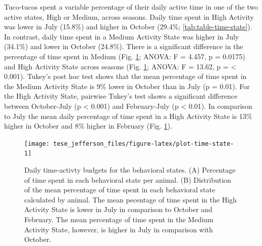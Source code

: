 \documentclass[english,msc,numbers,hidelinks]{coppe}
\begin{document}
  Tuco-tucos spent a variable percentage of their daily active time in one of the two active states, High or Medium, across seasons. Daily time spent in High Activity was lower in July (15.8\%) and higher in October (29.4\%; \ref{tab:table-time-state}). In contrast, daily time spent in a Medium Activity State was higher in July (34.1\%) and lower in October (24.8\%). There is a significant difference in the percentage of time spent in Medium (Fig. \ref{fig:plot-time-state}; ANOVA: F = 4.457, p = 0.0175) and High Activity State across seasons (Fig. \ref{fig:plot-time-state}; ANOVA: F = 13.62, p = \textless{} 0.001). Tukey's post hoc test shows that the mean percentage of time spent in the Medium Activity State is 9\% lower in October than in July (p = 0.01). For the High Activity State, pairwise Tukey's test shows a significant difference between October-July (p \textless{} 0.001) and February-July (p \textless{} 0.01). In comparison to July the mean daily percentage of time spent in a High Activity State is 13\% higher in October and 8\% higher in February (Fig. \ref{fig:plot-time-state}).
  \begin{figure}

  {\centering \texttt{[image: tese\_jefferson\_files/figure-latex/plot-time-state-1]} 

  }

  \caption{Daily time-activty budgets for the behavioral states. (A) Percentage of time spent in each behavioral state per animal. (B) Distribution of the mean percentage of time spent in each behavioral state calculated by animal. The mean pecentage of time spent in the High Activity State is lower in July in comparison to October and February. The mean percentage of time spent in the Medium Activity State, however, is higher in July in comparison with October.}\label{fig:plot-time-state}
  \end{figure}
  \newpage
\end{document}
